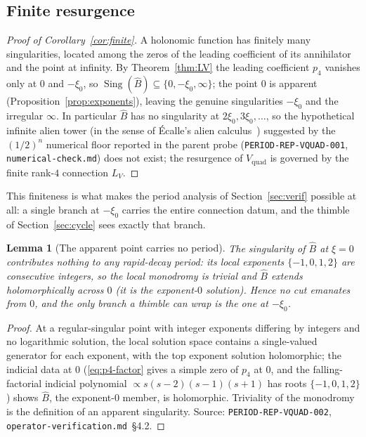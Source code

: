 \documentclass[11pt,reqno]{amsart}
\renewcommand{\_}{\vquadorigunderscore\allowbreak}
\theoremstyle{plain}
\newtheorem{lemma}[theorem]{Lemma}
\theoremstyle{definition}
\newcommand{\Vquad}{V_{\mathrm{quad}}}
\newcommand{\Bhat}{\widehat{B}}
\newcommand{\LV}{L_{V}}
\newcommand{\xizero}{\xi_0}
\begin{document}
\subsection{Finite resurgence}
\begin{proof}[Proof of Corollary~\ref{cor:finite}]
A holonomic function has finitely many singularities, located among the zeros of the leading
coefficient of its annihilator and the point at infinity. By Theorem~\ref{thm:LV} the leading
coefficient $p_4$ vanishes only at $0$ and $-\xizero$, so
$\operatorname{Sing}(\Bhat)\subseteq\{0,-\xizero,\infty\}$; the point $0$ is apparent
(Proposition~\ref{prop:exponents}), leaving the genuine singularities $-\xizero$ and the
irregular $\infty$. In particular $\Bhat$ has no singularity at $2\xizero,3\xizero,\dots$, so the
hypothetical infinite alien tower (in the sense of \'Ecalle's alien calculus~\cite{Ecalle})
suggested by the $(1/2)^n$ numerical floor reported in the parent probe
(\texttt{PERIOD-REP-VQUAD-001}, \texttt{numerical-check.md})
does not exist; the resurgence of $\Vquad$ is governed by the finite rank-$4$ connection $\LV$.
\end{proof}

This finiteness is what makes the period analysis of Section~\ref{sec:verif} possible at all: a
single branch at $-\xizero$ carries the entire connection datum, and the thimble of
Section~\ref{sec:cycle} sees exactly that branch.

\begin{lemma}[The apparent point carries no period]\label{lem:apparent}
The singularity of $\Bhat$ at $\xi=0$ contributes nothing to any rapid-decay period: its local
exponents $\{-1,0,1,2\}$ are consecutive integers, so the local monodromy is trivial and $\Bhat$
extends holomorphically across $0$ (it is the exponent-$0$ solution). Hence no cut emanates from
$0$, and the only branch a thimble can wrap is the one at $-\xizero$.
\end{lemma}

\begin{proof}
At a regular-singular point with integer exponents differing by integers and no logarithmic
solution, the local solution space contains a single-valued generator for each exponent, with the
top exponent solution holomorphic; the indicial data at $0$
(\eqref{eq:p4-factor} gives a simple zero of $p_4$ at $0$, and the falling-factorial indicial
polynomial $\propto s(s-2)(s-1)(s+1)$ has roots $\{-1,0,1,2\}$) shows $\Bhat$, the exponent-$0$
member, is holomorphic. Triviality of the monodromy is the definition of an apparent singularity.
Source: \texttt{PERIOD-REP-VQUAD-002}, \texttt{operator-verification.md}~\S4.2.
\end{proof}
\end{document}
